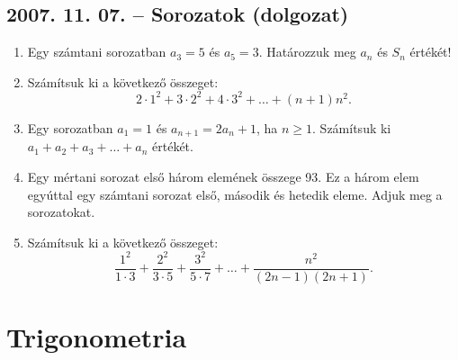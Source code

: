 \subsection*{2007. 11. 07. -- Sorozatok (dolgozat)}
\begin{enumerate}
\item Egy számtani sorozatban $a_3=5$ és $a_5=3$. 
Határozzuk meg $a_n$ és $S_n$ értékét!
\item Számítsuk ki a következő összeget:
$$2\cdot 1^2+3\cdot 2^2+4\cdot 3^2+\ldots+(n+1)n^2.$$
\item Egy sorozatban $a_1=1$ és $a_{n+1}=2a_n+1$, ha $n \ge 1$.
Számítsuk ki $a_1+a_2+a_3+\ldots+a_n$ értékét.
\item Egy mértani sorozat első három elemének összege 93. Ez a három elem egyúttal egy számtani sorozat első, második és hetedik eleme. Adjuk meg a sorozatokat.
\item Számítsuk ki a következő összeget:
$$\frac{1^2}{1\cdot 3}+ 
\frac{2^2}{3\cdot 5}+
\frac{3^2}{5\cdot 7}+\ldots+
\frac{n^2}{(2n-1)(2n+1)}.$$
\end{enumerate}


\section{Trigonometria}

